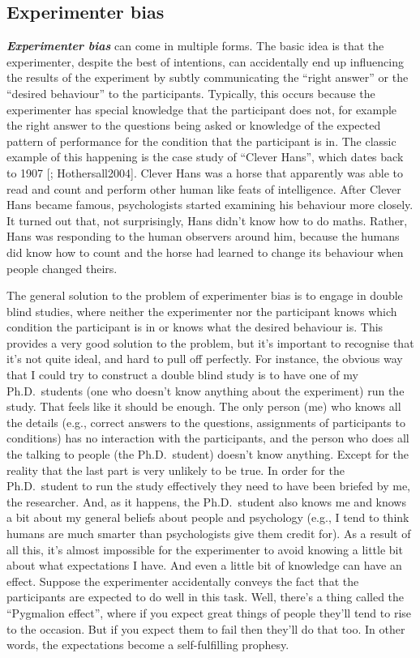 \documentclass[
]{book}
\begin{document}
\hypertarget{experimenter-bias}{%
\subsection{Experimenter bias}\label{experimenter-bias}}

\textbf{\emph{Experimenter bias}} can come in multiple forms. The basic idea is that the experimenter, despite the best of intentions, can accidentally end up influencing the results of the experiment by subtly communicating the ``right answer'' or the ``desired behaviour'' to the participants. Typically, this occurs because the experimenter has special knowledge that the participant does not, for example the right answer to the questions being asked or knowledge of the expected pattern of performance for the condition that the participant is in. The classic example of this happening is the case study of ``Clever Hans'', which dates back to 1907 {[}\citet{Pfungst1911}; Hothersall2004{]}. Clever Hans was a horse that apparently was able to read and count and perform other human like feats of intelligence. After Clever Hans became famous, psychologists started examining his behaviour more closely. It turned out that, not surprisingly, Hans didn't know how to do maths. Rather, Hans was responding to the human observers around him, because the humans did know how to count and the horse had learned to change its behaviour when people changed theirs.

The general solution to the problem of experimenter bias is to engage in double blind studies, where neither the experimenter nor the participant knows which condition the participant is in or knows what the desired behaviour is. This provides a very good solution to the problem, but it's important to recognise that it's not quite ideal, and hard to pull off perfectly. For instance, the obvious way that I could try to construct a double blind study is to have one of my Ph.D.~students (one who doesn't know anything about the experiment) run the study. That feels like it should be enough. The only person (me) who knows all the details (e.g., correct answers to the questions, assignments of participants to conditions) has no interaction with the participants, and the person who does all the talking to people (the Ph.D.~student) doesn't know anything. Except for the reality that the last part is very unlikely to be true. In order for the Ph.D.~student to run the study effectively they need to have been briefed by me, the researcher. And, as it happens, the Ph.D.~student also knows me and knows a bit about my general beliefs about people and psychology (e.g., I tend to think humans are much smarter than psychologists give them credit for). As a result of all this, it's almost impossible for the experimenter to avoid knowing a little bit about what expectations I have. And even a little bit of knowledge can have an effect. Suppose the experimenter accidentally conveys the fact that the participants are expected to do well in this task. Well, there's a thing called the ``Pygmalion effect'', where if you expect great things of people they'll tend to rise to the occasion. But if you expect them to fail then they'll do that too. In other words, the expectations become a self-fulfilling prophesy.
\end{document}
